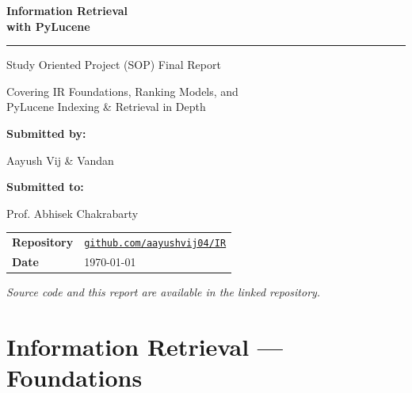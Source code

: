 \documentclass[11pt,a4paper]{article}
\begin{document}
\begin{titlepage}
  \centering
  \vspace*{1.5cm}
  {\Huge\bfseries\color{accent} Information Retrieval \\ with PyLucene \par}
  \vspace{0.6cm}
  \rule{0.6\linewidth}{1.2pt}
  \vspace{0.5cm}

  {\large Study Oriented Project (SOP) Final Report \par}
  \vspace{0.4cm}
  {\normalsize Covering IR Foundations, Ranking Models, and\\
               PyLucene Indexing \& Retrieval in Depth\par}

  \vspace{1.5cm}
  {\large \textbf{Submitted by:} \par}
  \vspace{0.2cm}
  {\large Aayush Vij \& Vandan \par}
  
  \vspace{1.5cm}
  {\large \textbf{Submitted to:} \par}
  \vspace{0.2cm}
  {\large Prof. Abhisek Chakrabarty \par}

  \vspace{1.5cm}
  \begin{tabular}{ll}
    \textbf{Repository} &
    \href{https://github.com/aayushvij04/IR}{\texttt{github.com/aayushvij04/IR}} \\
    \textbf{Date}       & \today \\
  \end{tabular}

  \vfill
  \small\textit{Source code and this report are available in the linked repository.}
\end{titlepage}

\section{Information Retrieval — Foundations}
\end{document}
